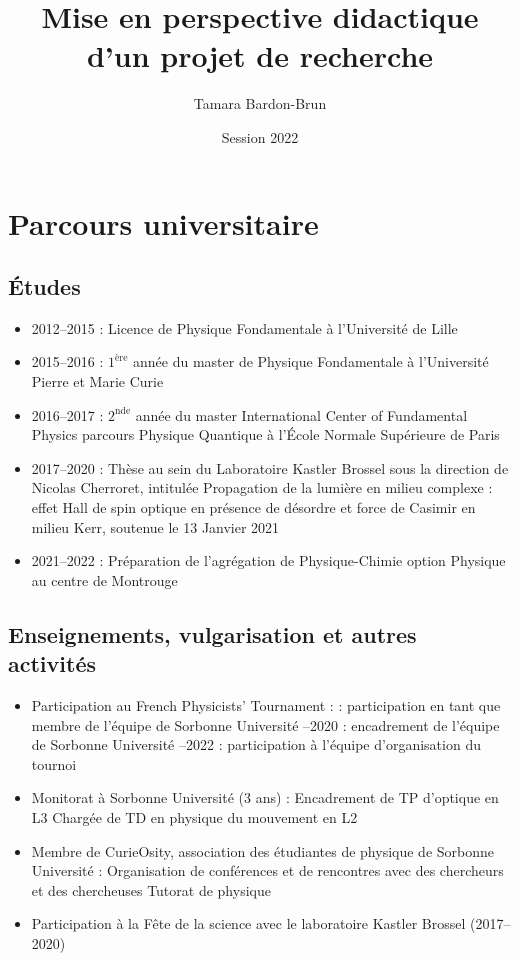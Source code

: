 \documentclass[a4paper,11pt]{article} %
\title{Mise en perspective didactique d'un projet de recherche}
\author{Tamara Bardon-Brun}
\date{Session 2022}
\newcommand{\pointmedian}{\fontfamily{cmr}\selectfont\textperiodcentered}
\begin{document}
	\label{key}
	\maketitle
	
	\section{Parcours universitaire}
	\subsection{\'{E}tudes}
	\begin{itemize}
		\item 2012--2015 : Licence de Physique Fondamentale à l'Université de Lille
		\item 2015--2016 : $1^\text{ère}$ année du master de Physique Fondamentale à l'Université Pierre et Marie Curie
		\item 2016--2017 : $2^\text{nde}$ année du master International Center of Fundamental Physics parcours Physique Quantique à l'\'{E}cole Normale Supérieure de Paris
		\item 2017--2020 : Thèse au sein du Laboratoire Kastler Brossel sous la direction de Nicolas Cherroret, intitulée \og Propagation de la lumière en milieu complexe : effet Hall de spin optique en présence de désordre et force de Casimir en milieu Kerr\fg{}, soutenue le 13 Janvier 2021
		\item 2021--2022 : Préparation de l'agrégation de Physique-Chimie option Physique au centre de Montrouge
	\end{itemize}
	
	\subsection{Enseignements, vulgarisation et autres activités}
	\begin{itemize}
		\item Participation au French Physicists' Tournament :
		 : participation en tant que membre de l'équipe de Sorbonne Université
		--2020 : encadrement de l'équipe de Sorbonne Université
		--2022 : participation à l'équipe d'organisation du tournoi \\
		\item Monitorat à Sorbonne Université (3 ans) :
		\subitem Encadrement de TP d'optique en L3
		\subitem Chargée de TD en physique du mouvement en L2 \\
		\item Membre de CurieOsity, association des étudiant\pointmedian es de physique de Sorbonne Université :
		\subitem Organisation de conférences et de rencontres avec des chercheurs et des chercheuses
		\subitem Tutorat de physique\\
		\item Participation à la Fête de la science avec le laboratoire Kastler Brossel (2017--2020)
	\end{itemize}
\end{document}
